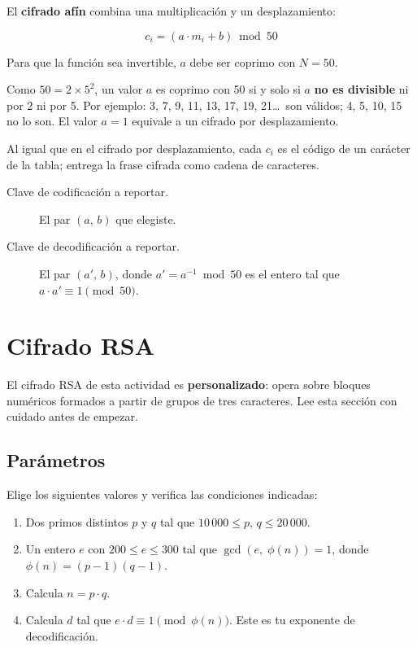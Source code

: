 \documentclass[12pt, oneside]{article}
\begin{document}
El \textbf{cifrado afín} combina una multiplicación y un desplazamiento:

\[
  c_i = (a \cdot m_i + b) \bmod 50
\]

Para que la función sea invertible, $a$ debe ser coprimo con $N = 50$.

\begin{recuerda}
  Como $50 = 2 \times 5^2$, un valor $a$ es coprimo con 50 si y solo si
  $a$ \textbf{no es divisible} ni por 2 ni por 5.  Por ejemplo: 3, 7,
  9, 11, 13, 17, 19, 21\ldots\ son válidos; 4, 5, 10, 15 no lo son.
  El valor $a = 1$ equivale a un cifrado por desplazamiento.
\end{recuerda}

Al igual que en el cifrado por desplazamiento, cada $c_i$ es el código
de un carácter de la tabla; entrega la frase cifrada como cadena de
caracteres.

\begin{description}
  \item[Clave de codificación a reportar.] El par $(a,\, b)$ que
        elegiste.
  \item[Clave de decodificación a reportar.] El par $(a',\, b)$, donde
        $a' = a^{-1} \bmod 50$ es el entero tal que
        $a \cdot a' \equiv 1 \pmod{50}$.
\end{description}

\newpage
\section{Cifrado RSA}

El cifrado RSA de esta actividad es \textbf{personalizado}: opera sobre
bloques numéricos formados a partir de grupos de tres caracteres.  Lee
esta sección con cuidado antes de empezar.

\subsection{Parámetros}

Elige los siguientes valores y verifica las condiciones indicadas:

\begin{enumerate}
  \item Dos primos distintos $p$ y $q$ tal que
        $10\,000 \le p,\, q \le 20\,000$.

  \item Un entero $e$ con $200 \le e \le 300$ tal que
        $\gcd\!\left(e,\; \phi(n)\right) = 1$,\; donde
        $\phi(n) = (p-1)(q-1)$.

  \item Calcula $n = p \cdot q$.

  \item Calcula $d$ tal que $e \cdot d \equiv 1 \pmod{\phi(n)}$.
        Este es tu exponente de decodificación.
\end{enumerate}
\end{document}
